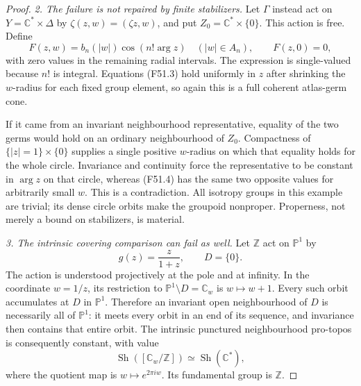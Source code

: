 \begin{proof}
\emph{2. The failure is not repaired by finite stabilizers.}
Let $\Gamma$ instead act on
$Y=\mathbb C^*\times\Delta$ by
$\zeta(z,w)=(\zeta z,w)$, and put
$Z_0=\mathbb C^*\times\{0\}$.
This action is free. Define
\[
 F(z,w)=b_n(|w|)\cos(n!\arg z)\quad(|w|\in A_n),
 \qquad F(z,0)=0,
                                                        \tag{F51.4}
\]
with zero values in the remaining radial intervals. The expression
is single-valued because $n!$ is integral. Equations (F51.3) hold
uniformly in $z$ after shrinking the $w$-radius for each fixed group
element, so again this is a full coherent atlas-germ cone.

If it came from an invariant neighbourhood representative, equality
of the two germs would hold on an ordinary neighbourhood of $Z_0$.
Compactness of $\{|z|=1\}\times\{0\}$ supplies a single positive
$w$-radius on which that equality holds for the whole circle.
Invariance and continuity force the representative to be constant
in $\arg z$ on that circle, whereas (F51.4) has the same two opposite
values for arbitrarily small $w$. This is a contradiction. All
isotropy groups in this example are trivial; its dense circle
orbits make the groupoid nonproper. Properness, not merely a bound
on stabilizers, is material.

\emph{3. The intrinsic covering comparison can fail as well.}
Let $\mathbb Z$ act on $\mathbb P^1$ by
\[
 g(z)=\frac{z}{1+z},\qquad D=\{0\}.
                                                        \tag{F51.5}
\]
The action is understood projectively at the pole and at infinity.
In the coordinate $w=1/z$, its restriction to
$\mathbb P^1\setminus D=\mathbb C_w$ is $w\mapsto w+1$.
Every such orbit accumulates at $D$ in $\mathbb P^1$.
Therefore an invariant open neighbourhood of $D$ is necessarily
all of $\mathbb P^1$: it meets every orbit in an end of its sequence,
and invariance then contains that entire orbit. The intrinsic
punctured neighbourhood pro-topos is consequently constant, with
value
\[
 \operatorname{Sh}([\mathbb C_w/\mathbb Z])
       \simeq\operatorname{Sh}(\mathbb C^*),
                                                        \tag{F51.6}
\]
where the quotient map is $w\mapsto e^{2\pi i w}$. Its fundamental
group is $\mathbb Z$.


\end{proof}
